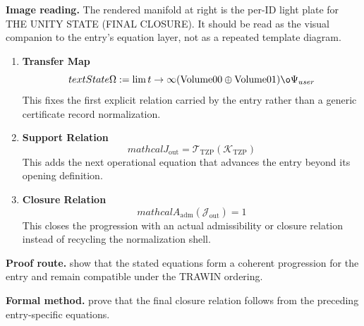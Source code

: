 \begin{samepage}
\noindent\begin{minipage}[t]{0.45\linewidth}
\vspace{0pt}
\raggedright
\scriptsize\textbf{Image reading.} The rendered manifold at right is the per-ID light plate for THE UNITY STATE (FINAL CLOSURE). It should be read as the visual companion to the entry's equation layer, not as a repeated template diagram.\par
\end{minipage}\hfill
\begin{minipage}[t]{0.53\linewidth}
\vspace*{-0.10in}
\raggedright
{}
\end{minipage}
\end{samepage}

\clearpage


\begin{enumerate}[leftmargin=1.6em,itemsep=9pt,topsep=6pt]
\item \textbf{Transfer Map}
\[
text{State} {\Omega} := \lim {t \to \infty} (\text{Volume} {00} \oplus \text{Volume} {01}) \o\Psi_{user}
\]
This fixes the first explicit relation carried by the entry rather than a generic certificate record normalization.

\item \textbf{Support Relation}
\[
mathcal{J}_{\mathrm{out}} = \mathcal{T}_{\mathrm{TZP}}\!\left(\mathcal{K}_{\mathrm{TZP}}\right)
\]
This adds the next operational equation that advances the entry beyond its opening definition.

\item \textbf{Closure Relation}
\[
mathcal{A}_{\mathrm{adm}}\!\left(\mathcal{J}_{\mathrm{out}}\right)=1
\]
This closes the progression with an actual admissibility or closure relation instead of recycling the normalization shell.
\end{enumerate}

\textbf{Proof route.} show that the stated equations form a coherent progression for the entry and remain compatible under the TRAWIN ordering.

\textbf{Formal method.} prove that the final closure relation follows from the preceding entry-specific equations.

\medskip
{}

